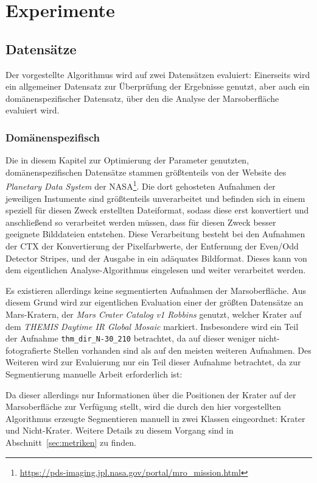 \chapter{Experimente}
\label{chap:experiments}

\section{Datensätze}
\label{sec:datasets}

Der vorgestellte Algorithmus wird auf zwei Datensätzen evaluiert: Einerseits wird ein allgemeiner Datensatz zur Überprüfung der Ergebnisse genutzt, aber auch ein domänenspezifischer Datensatz, über den die Analyse der Marsoberfläche evaluiert wird. 

\subsection{Domänenspezifisch}
\label{ssec:dataset_domain}

Die in diesem Kapitel zur Optimierung der Parameter genutzten, domänenspezifischen Datensätze stammen größtenteils von der Website des \textit{Planetary Data System} der NASA\footnote{\url{https://pds-imaging.jpl.nasa.gov/portal/mro\_mission.html}}. Die dort gehosteten Aufnahmen der jeweiligen Instumente sind größtenteils unverarbeitet und befinden sich in einem speziell für diesen Zweck erstellten Dateiformat, sodass diese erst konvertiert und anschließend so verarbeitet werden müssen, dass für diesen Zweck besser geeignete Bilddateien entstehen.
Diese Verarbeitung besteht bei den Aufnahmen der CTX der Konvertierung der Pixelfarbwerte, der Entfernung der Even/Odd Detector Stripes, und der Ausgabe in ein adäquates Bildformat. Dieses kann von dem eigentlichen Analyse-Algorithmus eingelesen und weiter verarbeitet werden.

Es existieren allerdings keine segmentierten Aufnahmen der Marsoberfläche. Aus diesem Grund wird zur eigentlichen Evaluation einer der größten Datensätze an Mars-Kratern, der \textit{Mars Crater Catalog v1 Robbins} \cite{robbins_12} genutzt, welcher Krater auf dem \textit{THEMIS Daytime IR Global Mosaic} markiert. Insbesondere wird ein Teil der Aufnahme \texttt{thm\_dir\_N-30\_210} betrachtet, da auf dieser weniger nicht-fotografierte Stellen vorhanden sind als auf den meisten weiteren Aufnahmen. Des Weiteren wird zur Evaluierung nur ein Teil dieser Aufnahme betrachtet, da zur Segmentierung manuelle Arbeit erforderlich ist:

Da dieser allerdings nur Informationen über die Positionen der Krater auf der Marsoberfläche zur Verfügung stellt, wird die durch den hier vorgestellten Algorithmus erzeugte Segmentieren manuell in zwei Klassen eingeordnet: Krater und Nicht-Krater. Weitere Details zu diesem Vorgang sind in Abschnitt~\ref{sec:metriken} zu finden.

